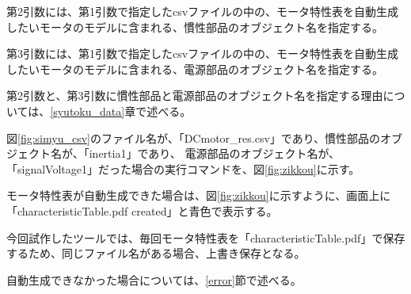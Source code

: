 第2引数には、第1引数で指定したcsvファイルの中の、モータ特性表を自動生成したいモータのモデルに含まれる、慣性部品のオブジェクト名を指定する。

第3引数には、第1引数で指定したcsvファイルの中の、モータ特性表を自動生成したいモータのモデルに含まれる、電源部品のオブジェクト名を指定する。

第2引数と、第3引数に慣性部品と電源部品のオブジェクト名を指定する理由については、\ref{syutoku_data}章で述べる。

図\ref{fig:simyu_csv}のファイル名が、「DCmotor\_res.csv」であり、慣性部品のオブジェクト名が、「inertia1」であり、
電源部品のオブジェクト名が、「signalVoltage1」だった場合の実行コマンドを、図\ref{fig:zikkou}に示す。

モータ特性表が自動生成できた場合は、図\ref{fig:zikkou}に示すように、画面上に「characteristicTable.pdf created」と青色で表示する。

今回試作したツールでは、毎回モータ特性表を「characteristicTable.pdf」で保存するため、同じファイル名がある場合、上書き保存となる。

自動生成できなかった場合については、\ref{error}節で述べる。\\


